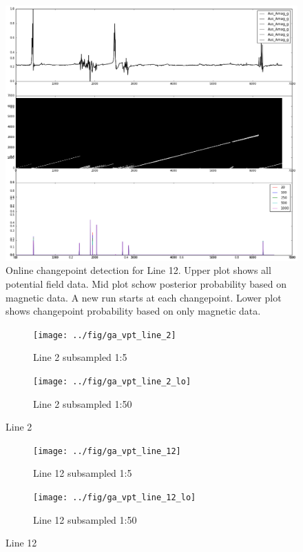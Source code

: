 \begin{figure}[h]
\centering
\includegraphics[width=1\linewidth]{../fig/1v_12_hi_Nw}
\caption[On-line changepoint detection. Line 12 (1:5)]{Online changepoint detection for Line 12. Upper plot shows all potential field data. Mid plot schow posterior probability based on magnetic data. A new run starts at each changepoint. Lower plot shows changepoint probability based on only magnetic data.}
\label{fig:1v12hinw}
\end{figure}

\begin{figure}
	\centering
	\begin{subfigure}[b]{1\textwidth}
		\centering
		\texttt{[image: ../fig/ga\_vpt\_line\_2]}
		\caption[Line 2]{Line 2 subsampled 1:5 }
		\label{fig:galine2}
	\end{subfigure}
	
	\begin{subfigure}[b]{1\textwidth}
		\centering
		\texttt{[image: ../fig/ga\_vpt\_line\_2\_lo]}
		\caption[Line 2]{Line 2 subsampled 1:50 }
		\label{fig:galine2_lo}
	\end{subfigure}
	
	\caption[Line 2]{Line 2}
\end{figure}

\begin{figure}
	\centering
	\begin{subfigure}[b]{1\textwidth}
		\centering
		\texttt{[image: ../fig/ga\_vpt\_line\_12]}
		\caption[Line 12]{Line 12 subsampled 1:5 }
		\label{fig:galine12}
	\end{subfigure}
	
	\begin{subfigure}[b]{1\textwidth}
		\centering
		\texttt{[image: ../fig/ga\_vpt\_line\_12\_lo]}
		\caption[Line 12]{Line 12 subsampled 1:50 }
		\label{fig:galine12_lo}
	\end{subfigure}
	
	\caption[Line 12]{Line 12}
\end{figure}

